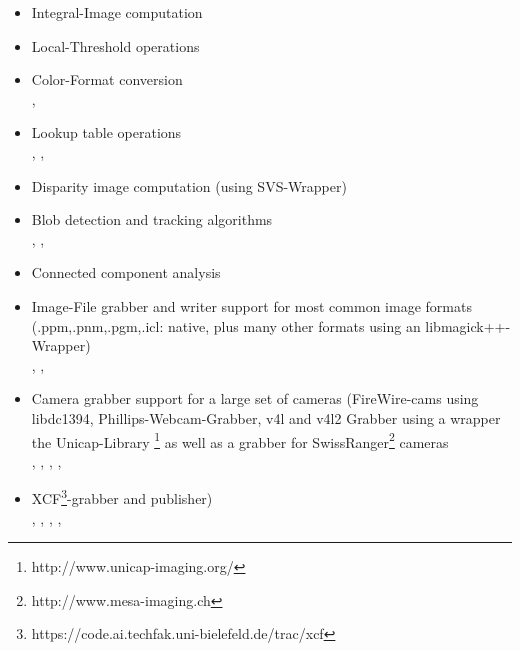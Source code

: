 \begin{itemize}
\item Integral-Image computation\\

\item Local-Threshold operations\\

\item Color-Format conversion\\
, 

\item Lookup table operations\\
, , 

\item Disparity image computation (using SVS-Wrapper)\\

\item Blob detection and tracking algorithms\\
, , 

\item Connected component analysis\\

\item Image-File grabber and writer support for most common image formats (.ppm,.pnm,.pgm,.icl: native, plus many other formats using an libmagick++-Wrapper)\\
, , 

\item Camera grabber support for a large set of cameras (FireWire-cams using libdc1394, Phillips-Webcam-Grabber, v4l and v4l2 Grabber using a wrapper the Unicap-Library \footnote{http://www.unicap-imaging.org/} as well as a grabber for SwissRanger\footnote{http://www.mesa-imaging.ch} cameras\\
, , , , 

\item XCF\footnote{https://code.ai.techfak.uni-bielefeld.de/trac/xcf}-grabber and publisher)\\
, , ,
,    


\end{itemize}
